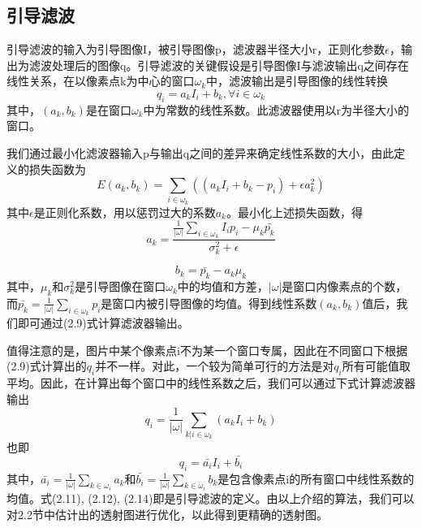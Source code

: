\documentclass[a4paper, 12pt]{report}
\begin{document}
\subsection{引导滤波\quad}
引导滤波的输入为引导图像I，被引导图像p，滤波器半径大小r，正则化参数$\epsilon$，输出为滤波处理后的图像q。引导滤波的关键假设是引导图像I与滤波输出q之间存在线性关系，在以像素点k为中心的窗口$\omega_k$中，滤波输出是引导图像的线性转换
\begin{equation}
q_i = a_k I_i + b_k, \forall i \in \omega_k
\end{equation}
其中，$(a_k, b_k)$是在窗口$\omega_k$中为常数的线性系数。此滤波器使用以r为半径大小的窗口。

我们通过最小化滤波器输入p与输出q之间的差异来确定线性系数的大小，由此定义的损失函数为
\begin{equation}
E(a_k, b_k) = \sum_{i\in \omega_k}((a_k I_i + b_k - p_i) + \epsilon a_k^2)
\end{equation}
其中$\epsilon$是正则化系数，用以惩罚过大的系数$a_k$。最小化上述损失函数，得
\begin{equation}
a_k = \frac{\frac{1}{|\omega|}\sum_{i\in \omega_k}I_ip_i - \mu_k\bar{p_k}}{\sigma_k^2 + \epsilon}
\end{equation}

\begin{equation}
b_k = \bar{p_k} - a_k \mu_k
\end{equation}
其中，$\mu_k$和$\sigma_k^2$是引导图像在窗口$\omega_k$中的均值和方差，$|\omega|$是窗口内像素点的个数，而$\bar{p_k} = \frac{1}{|\omega|}\sum_{i\in \omega_k}p_i$是窗口内被引导图像的均值。得到线性系数$(a_k, b_k)$值后，我们即可通过(2.9)式计算滤波器输出。

值得注意的是，图片中某个像素点i不为某一个窗口专属，因此在不同窗口下根据(2.9)式计算出的$q_i$并不一样。对此，一个较为简单可行的方法是对$q_i$所有可能值取平均。因此，在计算出每个窗口中的线性系数之后，我们可以通过下式计算滤波器输出
\begin{equation}
q_i = \frac{1}{|\omega|}\sum_{k|i\in \omega_k}(a_k I_i + b_k)
\end{equation}
也即
\begin{equation}
q_i = \bar{a_i}I_i + \bar{b_i}
\end{equation}
其中，$\bar{a_i} = \frac{1}{|\omega|}\sum_{k\in \omega_i}a_k$和$\bar{b_i} = \frac{1}{|\omega|}\sum_{k\in \omega_i}b_k$是包含像素点i的所有窗口中线性系数的均值。式(2.11), (2.12), (2.14)即是引导滤波的定义。由以上介绍的算法，我们可以对2.2节中估计出的透射图进行优化，以此得到更精确的透射图。
\end{document}
